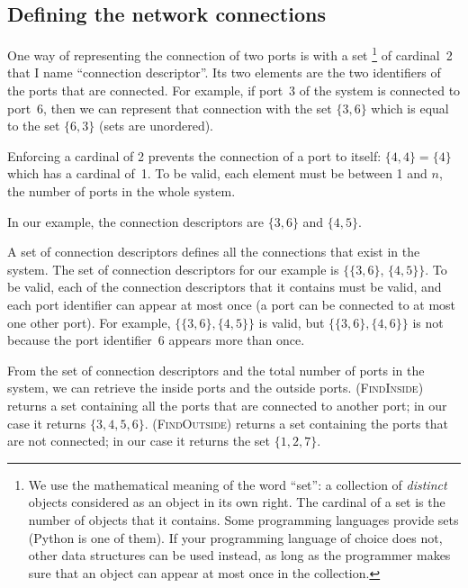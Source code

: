 
\subsection{Defining the network connections}

One way of representing the connection of two ports is with a set%
\footnote{
    We use the mathematical meaning of the word ``set'': a collection of \textit{distinct} objects considered as an object in its own right.
    The cardinal of a set is the number of objects that it contains.
    Some programming languages provide sets (Python is one of them).
    If your programming language of choice does not, other data structures can be used instead, as long as the programmer makes sure that an object can appear at most once in the collection.
}
of cardinal~2 that I name ``connection descriptor''.
Its two elements are the two identifiers of the ports that are connected.
For example, if port~3 of the system is connected to port~6, then we can represent that connection with the set $\lbrace 3, 6\rbrace$ which is equal to the set $\lbrace 6, 3\rbrace$ (sets are unordered).

Enforcing a cardinal of 2 prevents the connection of a port to itself: $\lbrace 4, 4\rbrace = \lbrace 4\rbrace$ which has a cardinal of~1.
To be valid, each element must be between 1 and $n$, the number of ports in the whole system.

In our example, the connection descriptors are $\lbrace 3, 6 \rbrace$ and $\lbrace 4, 5 \rbrace$.

A set of connection descriptors defines all the connections that exist in the system.
The set of connection descriptors for our example is
$\lbrace \lbrace 3, 6 \rbrace$, $\lbrace 4, 5 \rbrace \rbrace$.
To be valid, each of the connection descriptors that it contains must be valid, and each port identifier can appear at most once (a port can be connected to at most one other port).
For example,
$\lbrace \lbrace 3, 6 \rbrace, \lbrace 4, 5 \rbrace \rbrace$
is valid, but 
$\lbrace \lbrace 3, 6 \rbrace, \lbrace 4, 6 \rbrace \rbrace$
is not because the port identifier~6 appears more than once.

From the set of connection descriptors and the total number of ports in the system, we can retrieve the inside ports and the outside ports.
 (\textsc{FindInside}) returns a set containing all the ports that are connected to another port; in our case it returns $\lbrace 3, 4, 5, 6 \rbrace$.
 (\textsc{FindOutside}) returns a set containing the ports that are not connected; in our case it returns the set $\lbrace 1, 2, 7 \rbrace$.

